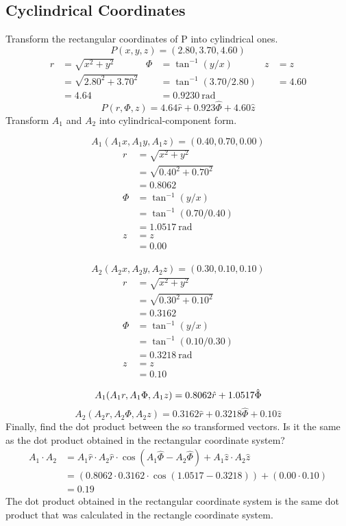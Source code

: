 \documentclass[12pt]{article}
\begin{document}
\subsection{Cyclindrical Coordinates}
Transform the rectangular coordinates of P into cylindrical ones. $$ P(x,y,z) = (2.80,3.70,4.60) $$
\[
    \begin{aligned}
        r &= \sqrt{x^2+y^2} & \Phi &= \tan^{-1}\left(y/x\right) & z &= z \\
        &=\sqrt{2.80^2+3.70^2} & &=\tan^{-1}\left(3.70/2.80\right) & &=4.60 \\
        &=4.64 & &=0.9230 \ \text{rad}
    \end{aligned}
\]
$$ P(r,\Phi,z) = 4.64\hat{r} + 0.923\hat{\Phi} + 4.60\hat{z}$$
Transform $A_1$ and $A_2$ into cylindrical-component form.
\begin{multicols}{2}
    $$ A_1(A_1x, A_1y, A_1z) = (0.40,0.70,0.00) $$
    \[
        \begin{aligned}
            r &= \sqrt{x^2+y^2} \\
            &=\sqrt{0.40^2+0.70^2} \\
            &=0.8062 \\
            \Phi &= \tan^{-1}\left(y/x\right) \\
            &=\tan^{-1}\left(0.70/0.40\right) \\
            &=1.0517 \ \text{rad} \\
            z &= z \\
            &=0.00
        \end{aligned}
    \]
    \columnbreak \\
    $$ A_2(A_2x, A_2y, A_2z) = (0.30,0.10,0.10) $$
    \[
        \begin{aligned}
            r &= \sqrt{x^2+y^2} \\
            &=\sqrt{0.30^2+0.10^2} \\
            &=0.3162 \\
            \Phi &= \tan^{-1}\left(y/x\right) \\
            &=\tan^{-1}\left(0.10/0.30\right) \\
            &=0.3218 \ \text{rad} \\
            z &= z \\
            &=0.10
        \end{aligned}
    \]
\end{multicols}
$$ A_1(A_1r, A_1\Phi, A_1z) \\ = 0.8062\hat{r} + 1.0517\hat{\Phi} $$
$$ A_2(A_2r, A_2\Phi, A_2z) = 0.3162\hat{r} + 0.3218\hat{\Phi} + 0.10\hat{z}$$
Finally, find the dot product between the so transformed vectors. Is it the same as the dot product
obtained in the rectangular coordinate system?
\[
\begin{aligned}
    A_1 \cdot A_2 &= A_1\hat{r} \cdot A_2\hat{r} \cdot \cos(A_1\hat{\Phi} - A_2\hat{\Phi}) + A_1\hat{z} \cdot A_2\hat{z} \\
    &= (0.8062 \cdot 0.3162 \cdot \cos(1.0517 - 0.3218)) + (0.00 \cdot 0.10) \\
    &= 0.19
\end{aligned}
\]
The dot product obtained in the rectangular coordinate system is the same dot product that was calculated in the rectangle coordinate system.
\end{document}
